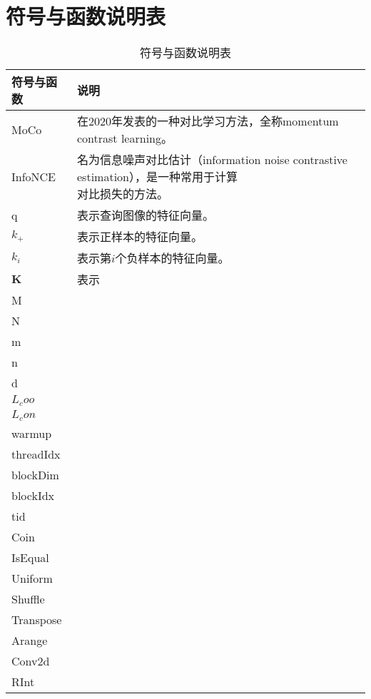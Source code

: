 \chapter{符号与函数说明表}

\begin{table*}[htb]
    \centering
    \small
    \caption{符号与函数说明表}
    \begin{tabular}{ll}
        \toprule
        符号与函数      & 说明         \\
        \midrule
        MoCo           & 在2020年发表的一种对比学习方法，全称momentum contrast learning。 \\
        InfoNCE        & \makecell[l]{名为信息噪声对比估计（information noise contrastive estimation），是一种常用于计算 \\ 对比损失的方法。} \\
        q              & 表示查询图像的特征向量。\\
        $k_+$          & 表示正样本的特征向量。 \\
        $k_i$          & 表示第$i$个负样本的特征向量。 \\
        $\mathbf{K}$   & 表示 \\
        M              &  \\
        N              &  \\
        m              &  \\
        n              &  \\
        d              &  \\
        $L_coo$        &  \\
        $L_con$        &  \\
        warmup         &  \\
        threadIdx      &  \\
        blockDim       &  \\
        blockIdx       &  \\
        tid            &  \\
        Coin           &  \\
        IsEqual        &  \\
        Uniform        &  \\
        Shuffle        &  \\
        Transpose      &  \\
        Arange         &  \\
        Conv2d         &  \\
        RInt           &  \\
        \bottomrule
    \end{tabular}
\end{table*}